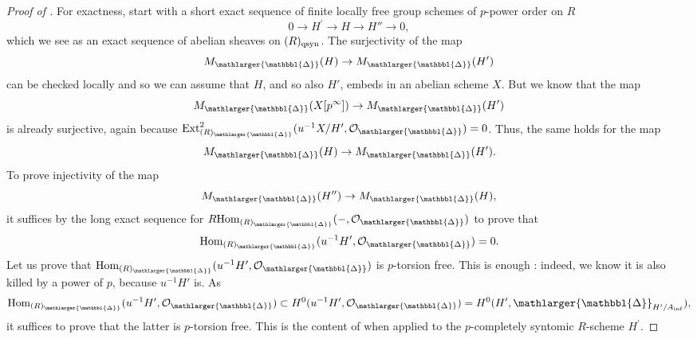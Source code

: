 \documentclass{amsart}
\newcommand{\prism}{{\mathlarger{\mathbbl{\Delta}}}}
\theoremstyle{plain}
\theoremstyle{definition}
\renewcommand{\inf}{\mathrm{inf}}
\begin{document}
\begin{proof}[Proof of ]
For exactness, start with a short exact sequence of finite locally free group schemes of $p$-power order on $R$ 
\[ 0 \to H^\prime \to H \to H'' \to 0, \]
which we see as an exact sequence of abelian sheaves on $(R)_{\rm qsyn}$. The surjectivity of the map
\[ M_{\prism}(H) \to M_{\prism}(H') \]
can be checked locally and so we can assume that $H$, and so also $H'$, embeds in an abelian scheme $X$. But we know that the map
\[ M_{\prism}(X[p^{\infty}]) \to M_{\prism}(H') \]
is already surjective, again because $\mathrm{Ext}_{(R)_{\prism}}^2(u^{-1} X/H^\prime, \mathcal{O}_{\prism})=0$. Thus, the same holds for the map
\[ M_{\prism}(H) \to M_{\prism}(H'). \]
To prove injectivity of the map 
\[ M_{\prism}(H'') \to M_{\prism}(H), \]
it suffices by the long exact sequence for $R\mathrm{Hom}_{(R)_{\prism}}(-, \mathcal{O}_{\prism})$ to prove that 
\[ \mathrm{Hom}_{(R)_{\prism}}(u^{-1} H', \mathcal{O}_{\prism}) = 0. \]
Let us prove that $\mathrm{Hom}_{(R)_{\prism}}(u^{-1} H', \mathcal{O}_{\prism})$ is $p$-torsion free. This is enough : indeed, we know it is also killed by a power of $p$, because $u^{-1}H'$ is. As
$$\mathrm{Hom}_{(R)_{\prism}}(u^{-1} H', \mathcal{O}_{\prism}) \subset H^0(u^{-1}H^\prime,\mathcal{O}_{\prism})=H^0(H^\prime, \prism_{H^{\prime}/A_\inf}), $$
it suffices to prove that the latter is $p$-torsion free. This is the content of  when applied to the $p$-completely syntomic $R$-scheme $H^\prime$.



\end{proof}
\end{document}
